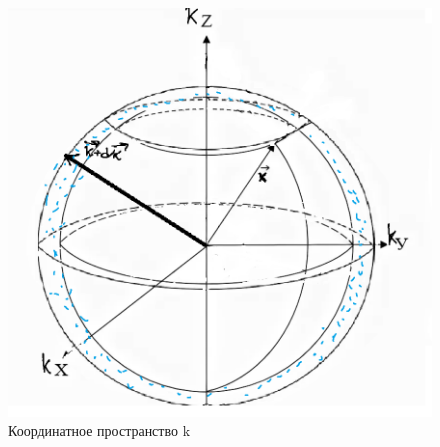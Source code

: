 \begin{figure} 
\vspace{-2ex}
\includegraphics[width=1.2\linewidth]{pictures/3.2.png}
\caption{Координатное пространство k}
\end{figure}

